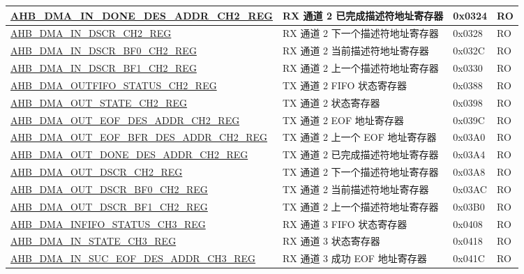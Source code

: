 \begin{longtable}{ | l | l | p{1.3cm} | l | }
\hyperref[regdesc:AHBDMAINDONEDESADDRCHNREG]{AHB\_DMA\_IN\_DONE\_DES\_ADDR\_CH2\_REG} & RX 通道 2 已完成描述符地址寄存器 & 0x0324 & RO    \\ \hline
\hyperref[regdesc:AHBDMAINDSCRCHNREG]{AHB\_DMA\_IN\_DSCR\_CH2\_REG} & RX 通道 2 下一个描述符地址寄存器 & 0x0328 & RO    \\ \hline
\hyperref[regdesc:AHBDMAINDSCRBF0CHNREG]{AHB\_DMA\_IN\_DSCR\_BF0\_CH2\_REG} & RX 通道 2 当前描述符地址寄存器 & 0x032C & RO    \\ \hline
\hyperref[regdesc:AHBDMAINDSCRBF1CHNREG]{AHB\_DMA\_IN\_DSCR\_BF1\_CH2\_REG} & RX 通道 2 上一个描述符地址寄存器 & 0x0330 & RO    \\ \hline
\hyperref[regdesc:AHBDMAOUTFIFOSTATUSCHNREG]{AHB\_DMA\_OUTFIFO\_STATUS\_CH2\_REG} & TX 通道 2 FIFO 状态寄存器 & 0x0388 & RO    \\ \hline
\hyperref[regdesc:AHBDMAOUTSTATECHNREG]{AHB\_DMA\_OUT\_STATE\_CH2\_REG} & TX 通道 2 状态寄存器 & 0x0398 & RO    \\ \hline
\hyperref[regdesc:AHBDMAOUTEOFDESADDRCHNREG]{AHB\_DMA\_OUT\_EOF\_DES\_ADDR\_CH2\_REG} & TX 通道 2 EOF 地址寄存器 & 0x039C & RO    \\ \hline
\hyperref[regdesc:AHBDMAOUTEOFBFRDESADDRCHNREG]{AHB\_DMA\_OUT\_EOF\_BFR\_DES\_ADDR\_CH2\_REG} & TX 通道 2 上一个 EOF 地址寄存器 & 0x03A0 & RO    \\ \hline
\hyperref[regdesc:AHBDMAOUTDONEDESADDRCHNREG]{AHB\_DMA\_OUT\_DONE\_DES\_ADDR\_CH2\_REG} & TX 通道 2 已完成描述符地址寄存器 & 0x03A4 & RO    \\ \hline
\hyperref[regdesc:AHBDMAOUTDSCRCHNREG]{AHB\_DMA\_OUT\_DSCR\_CH2\_REG} & TX 通道 2 下一个描述符地址寄存器 & 0x03A8 & RO    \\ \hline
\hyperref[regdesc:AHBDMAOUTDSCRBF0CHNREG]{AHB\_DMA\_OUT\_DSCR\_BF0\_CH2\_REG} & TX 通道 2 当前描述符地址寄存器 & 0x03AC & RO    \\ \hline
\hyperref[regdesc:AHBDMAOUTDSCRBF1CHNREG]{AHB\_DMA\_OUT\_DSCR\_BF1\_CH2\_REG} & TX 通道 2 上一个描述符地址寄存器 & 0x03B0 & RO    \\ \hline
\hyperref[regdesc:AHBDMAINFIFOSTATUSCHNREG]{AHB\_DMA\_INFIFO\_STATUS\_CH3\_REG} & RX 通道 3 FIFO 状态寄存器 & 0x0408 & RO    \\ \hline
\hyperref[regdesc:AHBDMAINSTATECHNREG]{AHB\_DMA\_IN\_STATE\_CH3\_REG} & RX 通道 3 状态寄存器 & 0x0418 & RO    \\ \hline
\hyperref[regdesc:AHBDMAINSUCEOFDESADDRCHNREG]{AHB\_DMA\_IN\_SUC\_EOF\_DES\_ADDR\_CH3\_REG} & RX 通道 3 成功 EOF 地址寄存器 & 0x041C & RO    \\ \hline

\end{longtable}
